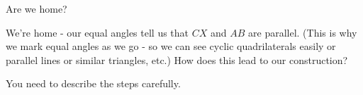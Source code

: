Are we home?







We're home - our equal angles tell us that $CX$ and $AB$ are parallel. (This is why we mark equal angles as we go - so we can see cyclic quadrilaterals easily or parallel lines or similar triangles, etc.)  How does this lead to our construction?

You need to describe the steps carefully.







